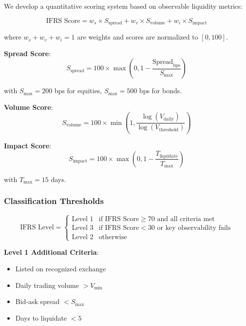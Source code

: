\documentclass[11pt,a4paper]{article}
\begin{document}
We develop a quantitative scoring system based on observable liquidity metrics:

\begin{equation}
\text{IFRS Score} = w_s \times S_{\text{spread}} + w_v \times S_{\text{volume}} + w_i \times S_{\text{impact}}
\end{equation}

where $w_s + w_v + w_i = 1$ are weights and scores are normalized to $[0, 100]$.

\textbf{Spread Score}:
\begin{equation}
S_{\text{spread}} = 100 \times \max\left(0, 1 - \frac{\text{Spread}_{\text{bps}}}{S_{\max}}\right)
\end{equation}

with $S_{\max} = 200$ bps for equities, $S_{\max} = 500$ bps for bonds.

\textbf{Volume Score}:
\begin{equation}
S_{\text{volume}} = 100 \times \min\left(1, \frac{\log(V_{\text{daily}})}{\log(V_{\text{threshold}})}\right)
\end{equation}

\textbf{Impact Score}:
\begin{equation}
S_{\text{impact}} = 100 \times \max\left(0, 1 - \frac{T_{\text{liquidate}}}{T_{\max}}\right)
\end{equation}

with $T_{\max} = 15$ days.

\subsubsection{Classification Thresholds}

\begin{equation}
\text{IFRS Level} = \begin{cases}
\text{Level 1} & \text{if IFRS Score} \geq 70 \text{ and all criteria met} \\
\text{Level 3} & \text{if IFRS Score} < 30 \text{ or key observability fails} \\
\text{Level 2} & \text{otherwise}
\end{cases}
\end{equation}

\textbf{Level 1 Additional Criteria}:
\begin{itemize}
    \item Listed on recognized exchange
    \item Daily trading volume $> V_{\text{min}}$
    \item Bid-ask spread $< S_{\max}$
    \item Days to liquidate $< 5$
\end{itemize}
\end{document}
